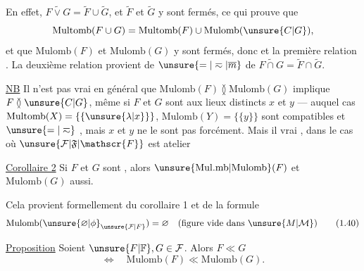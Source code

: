 
En effet, $\widetilde{F\vee G}=\widetilde F\cup\widetilde G$, et $\widetilde F$ et $\widetilde G$ y sont fermés,  ce qui prouve que
\[
 \mathrm{Multomb}(F\cup G)=\mathrm{Multomb}(F)\cup\mathrm{Mulomb}(\unsure{C|G}),
\]
et que $\mathrm{Mulomb}(F)$ et $\mathrm{Mulomb}(G)$ y sont fermés, donc \unsure{(*)} et la première relation \unsure{(**)|($\ll$)}. La deuxième relation \inserted{\unsure{(**)|($\ll$)}} provient de $\unsure{=|\eqsim|\overline{m}}$ de $\widetilde{F\cap G}=\widetilde F\cap\widetilde G$.

\uline{NB} Il n'est pas vrai en général que $\mathrm{Mulomb}(F)\between\mathrm{Mulomb}(G)$ implique $F\between\unsure{C|G}$, même si $F$ et $G$ sont  aux lieux distincts $x$ et $y$ --- auquel cas $\mathrm{Multomb}(X)=\{\{\unsure{\lambda|x}\}\}$, $\mathrm{Mulomb}(Y)=\{\{y\}\}$ sont compatibles et $\unsure{=|\eqsim}$ , mais $x$ et $y$ ne le sont pas forcément. Mais il  vrai , dans le cas où $\unsure{\mathcal{F}|\mathfrak{F}|\mathscr{F}}$ est  atelier 

\uline{Corollaire 2} Si $F$ et $G$ sont , alors $\unsure{\mathrm{Mul.mb}|\mathrm{Mulomb}}(F)$ et $\mathrm{Mulomb}(G)$ aussi.

Cela provient formellement du corollaire 1 et de la formule
\[
 \mathrm{Mulomb}(\unsure{\varnothing|\phi}_{\unsure{\mathcal{F}|F}})=\varnothing\quad(\text{figure vide dans }\unsure{M|\mathcal M})
 \tag*{(1.40)}
\]

\uline{Proposition} Soient $\unsure{F|\mathbb{F}},G\in\mathcal{F}$. Alors $F\ll G$
\[
 \Longleftrightarrow\quad\mathrm{Mulomb}(F)\ll\mathrm{Mulomb}(G).
\]
